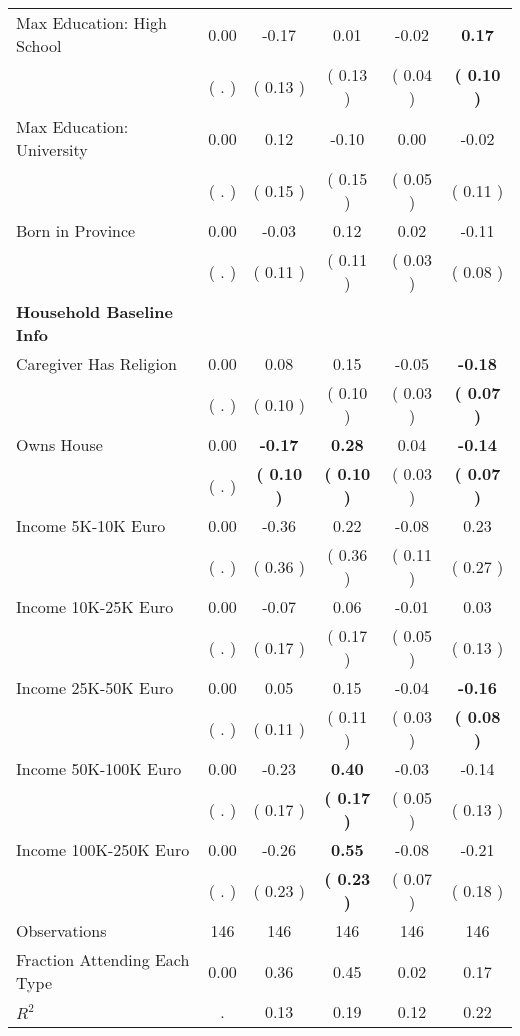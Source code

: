 \begin{table}[H]
{\begin{tabular}{lccccc}
\quad Max Education: High School &      0.00 &     -0.17 &      0.01 &     -0.02 & \textbf{     0.17} \\
\quad  & (        . ) & (     0.13 )  & (     0.13 )  & (     0.04 ) & \textbf{(     0.10 )} \\
\quad Max Education: University &      0.00 &      0.12 &     -0.10 &      0.00 &     -0.02 \\
\quad  & (        . ) & (     0.15 )  & (     0.15 )  & (     0.05 ) & (     0.11 ) \\
\quad Born in Province &      0.00 &     -0.03 &      0.12 &      0.02 &     -0.11 \\
\quad  & (        . ) & (     0.11 )  & (     0.11 )  & (     0.03 ) & (     0.08 ) \\
\midrule
\textbf{Household Baseline Info} \\
\quad Caregiver Has Religion &      0.00 &      0.08 &      0.15 &     -0.05 & \textbf{    -0.18} \\
\quad  & (        . ) & (     0.10 )  & (     0.10 )  & (     0.03 ) & \textbf{(     0.07 )} \\
\quad Owns House &      0.00 & \textbf{    -0.17} & \textbf{     0.28} &      0.04 & \textbf{    -0.14} \\
\quad  & (        . ) & \textbf{(     0.10 )}  & \textbf{(     0.10 )}  & (     0.03 ) & \textbf{(     0.07 )} \\
\quad Income 5K-10K Euro &      0.00 &     -0.36 &      0.22 &     -0.08 &      0.23 \\
\quad  & (        . ) & (     0.36 )  & (     0.36 )  & (     0.11 ) & (     0.27 ) \\
\quad Income 10K-25K Euro &      0.00 &     -0.07 &      0.06 &     -0.01 &      0.03 \\
\quad  & (        . ) & (     0.17 )  & (     0.17 )  & (     0.05 ) & (     0.13 ) \\
\quad Income 25K-50K Euro &      0.00 &      0.05 &      0.15 &     -0.04 & \textbf{    -0.16} \\
\quad  & (        . ) & (     0.11 )  & (     0.11 )  & (     0.03 ) & \textbf{(     0.08 )} \\
\quad Income 50K-100K Euro &      0.00 &     -0.23 & \textbf{     0.40} &     -0.03 &     -0.14 \\
\quad  & (        . ) & (     0.17 )  & \textbf{(     0.17 )}  & (     0.05 ) & (     0.13 ) \\
\quad Income 100K-250K Euro &      0.00 &     -0.26 & \textbf{     0.55} &     -0.08 &     -0.21 \\
\quad  & (        . ) & (     0.23 )  & \textbf{(     0.23 )}  & (     0.07 ) & (     0.18 ) \\
\midrule
Observations & 146 & 146 & 146 & 146 & 146 \\
Fraction Attending Each Type &      0.00 &      0.36 &      0.45 &      0.02 &      0.17 \\
\midrule
$ R^2$ &         . &      0.13 &      0.19 &      0.12 &      0.22 \\
\bottomrule
\end{tabular}}
\end{table}
